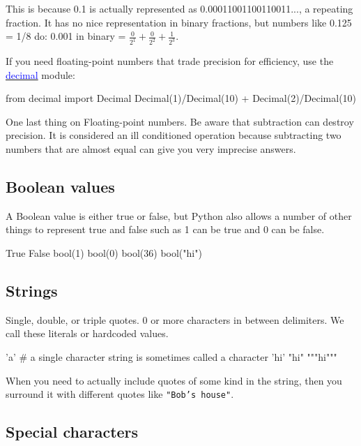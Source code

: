 \documentclass[titlepage]{tufte-book}
\begin{document}
\begin{fullwidth}
\noindent This is because 0.1 is actually represented as 0.00011001100110011..., a repeating fraction.  It has no nice representation in binary fractions, but numbers like 0.125 = 1/8 do: 0.001 in binary = $\frac{0}{2^1}+\frac{0}{2^2}+\frac{1}{2^3}$.

If you need floating-point numbers that trade precision for efficiency, use the \href{https://docs.python.org/2/library/decimal.html#module-decimal}{\textcolor{blue}{decimal}} module:

\begin{pyconsole}[z2]
from decimal import Decimal
Decimal(1)/Decimal(10) + Decimal(2)/Decimal(10)
\end{pyconsole}

One last thing on Floating-point numbers. Be aware that subtraction can destroy precision. It is considered an ill conditioned operation because subtracting two numbers that are almost equal can give you very imprecise answers.

\subsection{Boolean values}

A Boolean value is either true or false, but Python also allows a number of other things to represent true and false such as 1 can be true and 0 can be false.

\begin{pyconsole}[d]
True
False
bool(1)
bool(0)
bool(36)
bool("hi")
\end{pyconsole}

\subsection{Strings}

Single, double, or triple quotes. 0 or more characters in between delimiters. We call these literals or hardcoded values.

\begin{pyconsole}[e]
'a'  # a single character string is sometimes called a character
'hi'
"hi"
"""hi"""
\end{pyconsole}

When you need to actually include quotes of some kind in the string, then you surround it with different quotes like {\tt "Bob's house"}.

\subsection{Special characters}


\end{fullwidth}
\end{document}
